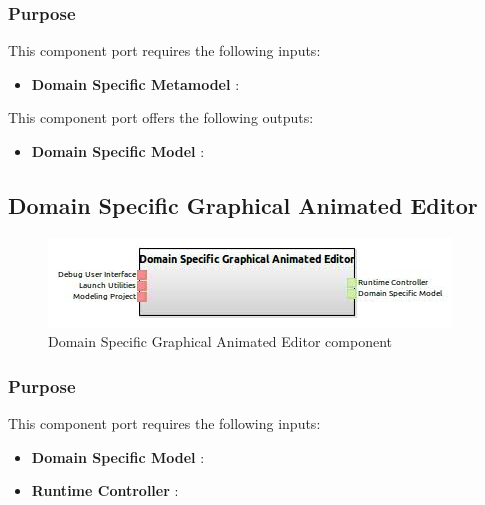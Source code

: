 \documentclass{gemoc} %
\begin{document}
\subsubsection{Purpose}

This component port requires the following inputs:
\begin{itemize}
  \item \textbf{Domain Specific Metamodel} :
\end{itemize}

This component port offers the following outputs:
\begin{itemize}
  \item \textbf{Domain Specific Model} :
\end{itemize}

\subsection{Domain Specific Graphical Animated Editor}

\begin{figure}[htp]
	\begin{center}
	\includegraphics*[trim=0.0cm 0.0cm 0cm 0.0cm, clip=true, scale=1.0]{../images/generated/Generated_Domain Specific Graphical Animated Editor.jpg}
	\caption{Domain Specific Graphical Animated Editor component}
	\end{center}
\end{figure}

\subsubsection{Purpose}

This component port requires the following inputs:
\begin{itemize}
  \item \textbf{Domain Specific Model} :
  \item \textbf{Runtime Controller} :
\end{itemize}
\end{document}
